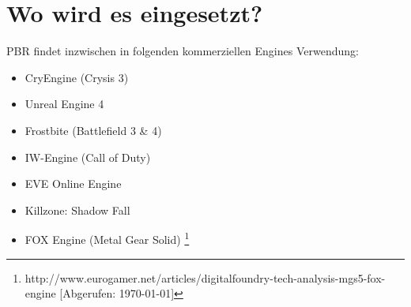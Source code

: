 
\section{Wo wird es eingesetzt?}
\label{sec:pbr-wo}

\ac{PBR} findet inzwischen in folgenden kommerziellen Engines Verwendung:
\begin{itemize}
\item CryEngine (Crysis 3) \parencite{Schulz2014}
\item Unreal Engine 4 \parencite{Martin2012}
\item Frostbite (Battlefield 3 \& 4) \parencite{Lagarde2014}
\item IW-Engine (Call of Duty) \parencite{Lazarov2011}
\item EVE Online Engine \parencite{CCP2014}
\item Killzone: Shadow Fall \parencite{Drobot2013}
\item FOX Engine (Metal Gear Solid) \footnote{http://www.eurogamer.net/articles/digitalfoundry-tech-analysis-mgs5-fox-engine [Abgerufen: \today]}
\end{itemize}

